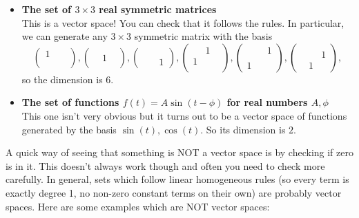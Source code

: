 \documentclass[11pt]{article}
\theoremstyle{plain} %
\theoremstyle{definition}
\theoremstyle{remark}
\begin{document}
\begin{itemize}
\item \textbf{The set of $3\times 3$ real symmetric matrices}\\
This is a vector space! You can check that it follows the rules. In particular, we can generate any $3\times 3$ symmetric matrix with the basis $$\begin{pmatrix}1&&\\&&\\&&\end{pmatrix},\begin{pmatrix}&&\\&1&\\&&\end{pmatrix},\begin{pmatrix}&&\\&&\\&&1\end{pmatrix},\begin{pmatrix}&1&\\1&&\\&&\end{pmatrix},\begin{pmatrix}&&1\\&&\\1&&\end{pmatrix},\begin{pmatrix}&&\\&&1\\&1&\end{pmatrix},$$
so the dimension is $6$.

\item \textbf{The set of functions $f(t) = A\sin(t - \phi)$ for real numbers $A, \phi$}\\
This one isn't very obvious but it turns out to be a vector space of functions generated by the basis $\sin(t), \cos(t)$. So its dimension is $2$.
\end{itemize}

A quick way of seeing that something is NOT a vector space is by checking if zero is in it. This doesn't always work though and often you need to check more carefully. In general, sets which follow linear homogeneous rules (so every term is exactly degree 1, no non-zero constant terms on their own) are probably vector spaces. Here are some examples which are NOT vector spaces:
\end{document}
